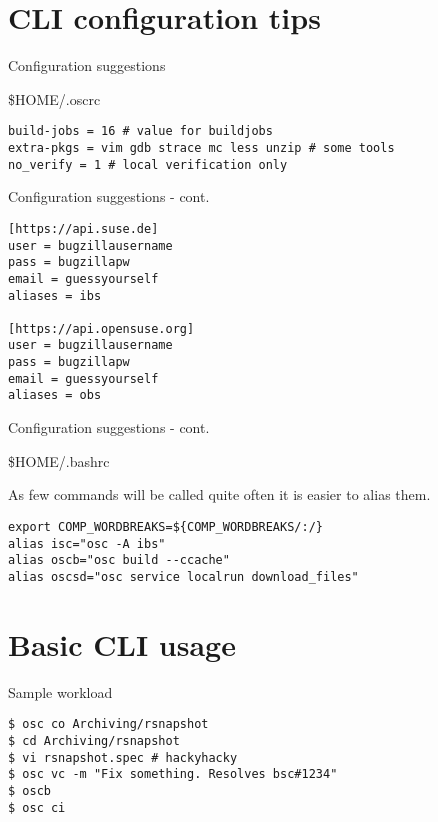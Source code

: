 \documentclass{beamer}
\begin{document}
\section{CLI configuration tips}

\begin{frame}[fragile]{Configuration suggestions}
	\begin{center}\$HOME/.oscrc\end{center}
	\begin{small}
	\begin{verbatim}
build-jobs = 16 # value for buildjobs
extra-pkgs = vim gdb strace mc less unzip # some tools
no_verify = 1 # local verification only
	\end{verbatim}
	\end{small}
\end{frame}

\begin{frame}[fragile]{Configuration suggestions - cont.}
	\begin{small}
	\begin{verbatim}
[https://api.suse.de]
user = bugzillausername
pass = bugzillapw
email = guessyourself
aliases = ibs

[https://api.opensuse.org]
user = bugzillausername
pass = bugzillapw
email = guessyourself
aliases = obs
	\end{verbatim}
	\end{small}
\end{frame}

\begin{frame}[fragile]{Configuration suggestions - cont.}
	\begin{center}\$HOME/.bashrc\end{center}
	As few commands will be called quite often it is easier to alias them.
	\begin{small}
	\begin{verbatim}
export COMP_WORDBREAKS=${COMP_WORDBREAKS/:/}
alias isc="osc -A ibs"
alias oscb="osc build --ccache"
alias oscsd="osc service localrun download_files"
	\end{verbatim}
	\end{small}
\end{frame}

\section{Basic CLI usage}

\begin{frame}[fragile]{Sample workload}
	\begin{small}
	\begin{verbatim}
$ osc co Archiving/rsnapshot
$ cd Archiving/rsnapshot
$ vi rsnapshot.spec # hackyhacky
$ osc vc -m "Fix something. Resolves bsc#1234"
$ oscb
$ osc ci
	\end{verbatim}
	\end{small}
\end{frame}
\end{document}
